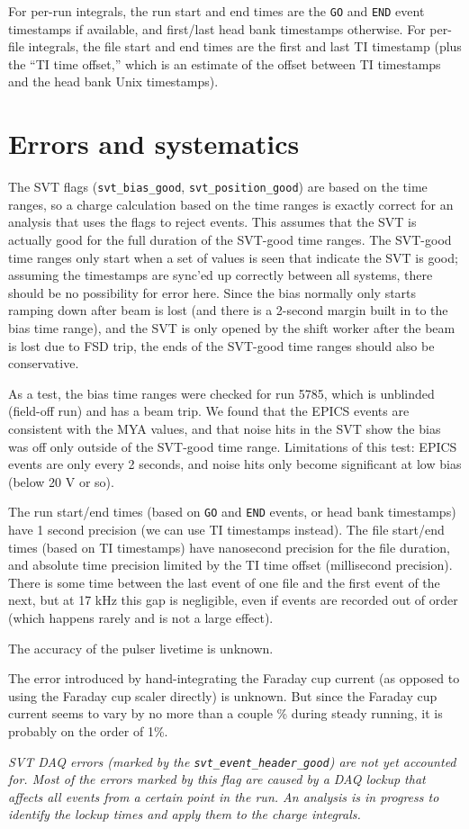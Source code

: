 \documentclass[aps,amsmath,amssymb,notitlepage,11pt,onecolumn]{revtex4-1}
\begin{document}
For per-run integrals, the run start and end times are the \texttt{GO} and \texttt{END} event timestamps if available, and first/last head bank timestamps otherwise.
For per-file integrals, the file start and end times are the first and last TI timestamp (plus the ``TI time offset,'' which is an estimate of the offset between TI timestamps and the head bank Unix timestamps).

\section{Errors and systematics}
The SVT flags (\texttt{svt\_bias\_good}, \texttt{svt\_position\_good}) are based on the time ranges, so a charge calculation based on the time ranges is exactly correct for an analysis that uses the flags to reject events.
This assumes that the SVT is actually good for the full duration of the SVT-good time ranges.
The SVT-good time ranges only start when a set of values is seen that indicate the SVT is good; assuming the timestamps are sync'ed up correctly between all systems, there should be no possibility for error here.
Since the bias normally only starts ramping down after beam is lost (and there is a 2-second margin built in to the bias time range), and the SVT is only opened by the shift worker after the beam is lost due to FSD trip, the ends of the SVT-good time ranges should also be conservative.

As a test, the bias time ranges were checked for run 5785, which is unblinded (field-off run) and has a beam trip.
We found that the EPICS events are consistent with the MYA values, and that noise hits in the SVT show the bias was off only outside of the SVT-good time range.
Limitations of this test: EPICS events are only every 2 seconds, and noise hits only become significant at low bias (below 20 V or so).

The run start/end times (based on \texttt{GO} and \texttt{END} events, or head bank timestamps) have 1 second precision (we can use TI timestamps instead).
The file start/end times (based on TI timestamps) have nanosecond precision for the file duration, and absolute time precision limited by the TI time offset (millisecond precision).
There is some time between the last event of one file and the first event of the next, but at 17 kHz this gap is negligible, even if events are recorded out of order (which happens rarely and is not a large effect).

The accuracy of the pulser livetime is unknown.

The error introduced by hand-integrating the Faraday cup current (as opposed to using the Faraday cup scaler directly) is unknown.
But since the Faraday cup current seems to vary by no more than a couple \% during steady running, it is probably on the order of 1\%.

\emph{SVT DAQ errors (marked by the \texttt{svt\_event\_header\_good}) are not yet accounted for. Most of the errors marked by this flag are caused by a DAQ lockup that affects all events from a certain point in the run. An analysis is in progress to identify the lockup times and apply them to the charge integrals.}
\end{document}
